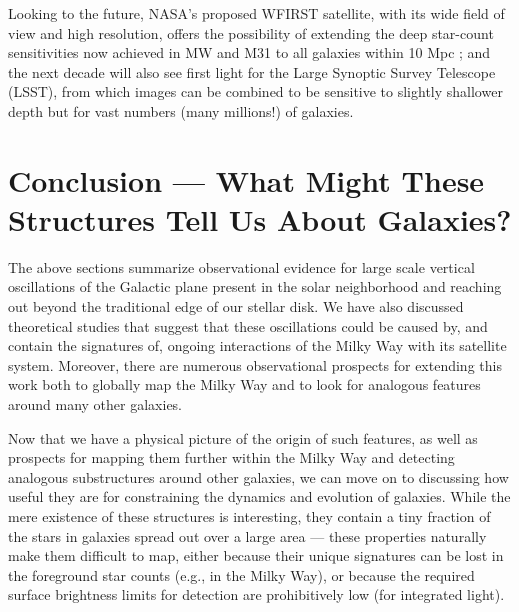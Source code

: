 \documentclass[galaxies,article,submit,moreauthors,pdftex,10pt,a4paper]{mdpi}
\begin{document}
Looking to the future,
NASA's proposed WFIRST satellite, with its wide field of view and high resolution, offers the possibility of extending the deep star-count sensitivities now achieved in MW and M31 to all galaxies within 10 Mpc \cite{spergel13}; and
the next decade will also see first light for the Large Synoptic Survey Telescope (LSST), from which images can be combined to be sensitive to slightly shallower depth \citep[$\sim$29 mag/arcsec$^2$, see][]{ivezic08} but for vast numbers (many millions!) of galaxies.


\section{Conclusion --- What Might These Structures Tell Us About Galaxies?}


\label{sec:conc}

The above sections summarize observational evidence for large scale vertical
oscillations of the Galactic plane present in the solar neighborhood and
reaching out beyond the traditional edge of our stellar disk.
We have also discussed theoretical studies that suggest that these oscillations
could be caused by, and contain the signatures of, ongoing interactions of the
Milky Way with its satellite system.
Moreover, there are numerous observational prospects for extending this work
both to globally map the Milky Way and to look for analogous features around
many other galaxies.

Now that we have a physical picture of the origin of such features, as well as prospects for mapping them further within the Milky Way and detecting analogous substructures around other galaxies, we can move on to discussing how useful they are for constraining the dynamics and evolution of galaxies.
While the mere existence of these structures is interesting, they contain a tiny fraction of the stars in galaxies spread out over a large area --- these properties naturally make them difficult to map, either because their unique signatures can be lost in the foreground star counts (e.g., in the Milky Way), or because the required surface brightness limits for detection are prohibitively low (for integrated light).
\end{document}
